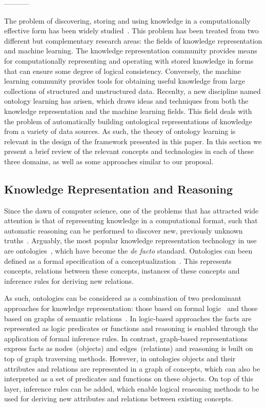 -----------

The problem of discovering, storing and using knowledge in a computationally effective
form has been widely studied~\cite{mitchell2015never, ROSPOCHER2016132, cimiano2009ontology}. 
This problem has been treated from two different but complementary research areas:
the fields of knowledge representation and machine learning.
The knowledge representation community provides means for
computationally representing and operating with stored knowledge in forms that
can ensure some degree of logical consistency. 
Conversely, the machine learning community provides
tools for obtaining useful knowledge from large collections of structured and unstructured data.
Recenlty, a new discipline named ontology learning has arisen, which draws ideas
and techniques from both the knowledge representation and the machine learning fields.
This field deals with the problem of automatically building ontological representations
of knowledge from a variety of data sources. As such, the theory of ontology learning
is relevant in the design of the framework presented in this paper.
In this section we present a brief review of the relevant concepts and technologies
in each of these three domains, as well as some approaches similar to our proposal.

	\subsection{Knowledge Representation and Reasoning}

    Since the dawn of computer science, one of the problems that has attracted wide attention
    is that of representing knowledge in a computational format, such that automatic reasoning
    can be performed to discover new, previously unknown truths~\cite{sowa2000knowledge}.
    Arguably, the most popular knowledge representation technology in use are
    ontologies~\cite{guarino1995formal}, which have
    become the \emph{de facto} standard.
	Ontologies can been defined as a formal specification of a conceptualization~\cite{asuncion2003}.
    This represents concepts, relations between these concepts, instances of these concepts and inference rules
    for deriving new relations. 

    As such, ontologies can be considered as a combination of two predominant approaches 
    for knowledge representation: those based on formal logic~\cite{brachman1992knowledge}
    and those based on graphs of semantic relations~\cite{chein2008graph}.
    In logic-based approaches the facts are represented as logic predicates or functions 
    and reasoning is enabled through the application of formal inference rules.
    In contrast, graph-based representations express facts as nodes~(objects)
    and edges~(relations) and reasoning is built on top of graph traversing methods.
    However, in ontologies objects and their attributes and relations are represented in a graph of concepts, 
    which can also be interpreted as a set of predicates and functions on these objects. 
    On top of this layer, inference rules can be added,
    which enable logical reasoning methods to be used for deriving new attributes and 
    relations between existing concepts.
    
